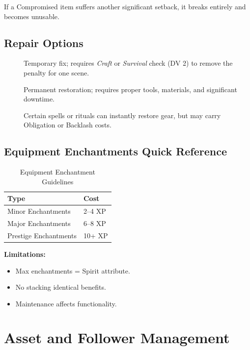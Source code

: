 If a Compromised item suffers another significant setback, it breaks entirely and becomes unusable.

\subsection{Repair Options}\label{subsec:gear_repair}

\begin{description}
    \item[] Temporary fix; requires \emph{Craft} or \emph{Survival} check (DV 2) to remove the penalty for one scene.
    \item[] Permanent restoration; requires proper tools, materials, and significant downtime.
    \item[] Certain spells or rituals can instantly restore gear, but may carry Obligation or Backlash costs.
\end{description}

\subsection{Equipment Enchantments Quick Reference}\label{subsec:enchantments}

\begin{longtable}{p{4cm} p{9cm}}
\caption{Equipment Enchantment Guidelines}\label{tab:enchantments}\\
\toprule
\textbf{Type} & \textbf{Cost} \\
\midrule
Minor Enchantments & 2--4 XP \\
Major Enchantments & 6--8 XP \\
Prestige Enchantments & 10+ XP \\
\bottomrule
\end{longtable}

\noindent \textbf{Limitations:}
\begin{itemize}
    \item Max enchantments = Spirit attribute.
    \item No stacking identical benefits.
    \item Maintenance affects functionality.
\end{itemize}

\section{Asset and Follower Management}\label{sec:asset_management}

